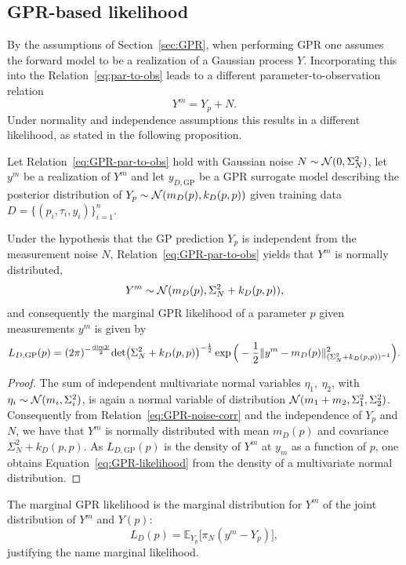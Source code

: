 \subsection{GPR-based likelihood}\label{sec:GPlike}
By the assumptions of Section~\ref{sec:GPR}, when performing GPR one assumes the forward model to be a realization of a Gaussian process $Y$.
Incorporating this into the Relation~\eqref{eq:par-to-obs} leads to a different parameter-to-observation relation
\begin{equation}\label{eq:GPR-par-to-obs}
    Y^m = Y_p + N.
\end{equation}
Under normality and independence assumptions this results in a different likelihood, as stated in the following proposition.

\begin{prp}
    Let Relation~\eqref{eq:GPR-par-to-obs} hold with Gaussian noise $N \sim \mathcal N (0, \Sigma_N^2)$, let $y^m$ be a realization of $Y^m$ and let $y_{D, \text{GP}}$ be a GPR surrogate model describing the posterior distribution of $Y_p \sim \mathcal N( m_D(p), k_D(p,p) )$ given training data $D = \{ (p_i, \tau_i, y_i) \}_{i=1}^n$.

    Under the hypothesis that the GP prediction $Y_p$ is independent from the measurement noise $N$, Relation~\eqref{eq:GPR-par-to-obs} yields that $Y^m$ is normally distributed,
    \[
    Y^m \sim \mathcal N(m_D(p), \Sigma_N^2 + k_D(p,p)), 
    \]
    and consequently the marginal GPR likelihood of a parameter $p$ given measurements $y^m$ is given by
    \begin{equation}\label{eq:GPR-likelihood}
        L_{D, \text{GP}}(p) = (2\pi)^{-\frac{\text{dim} \mathcal Y}{2}} \text{det}\big ( \Sigma_N^2 + k_D(p, p) \big )^{-\frac{1}{2}} \exp \Big( -\frac{1}{2}\lVert y^m - m_D(p)\rVert_{(\Sigma_N^2 + k_D(p,p))^{-1}}^2 \Big ).
    \end{equation}
\end{prp}
\begin{proof}
    The sum of independent multivariate normal variables $\eta_1, \ \eta_2$, with $\eta_i \sim \mathcal N(m_i, \Sigma^2_i)$, is again a normal variable of distribution $\mathcal N ( m_1 + m_2, \Sigma_1^2, \Sigma_2^2)$.
    Consequently from Relation~\eqref{eq:GPR-noise-corr} and the independence of $Y_p$ and $N$, we have that $Y^m$ is normally distributed with mean $m_D(p)$ and covariance $\Sigma_N^2 + k_D(p,p)$. \newline
    As $L_{D, \text{GP}}(p)$ is the density of $Y^m$ at $y_m$ as a function of $p$, one obtains Equation~\eqref{eq:GPR-likelihood} from the density of a multivariate normal distribution.
\end{proof}
\begin{rmk}
    The marginal GPR likelihood is the marginal distribution for $Y^m$ of the joint distribution of $Y^m$ and $Y(p)$:
    \begin{equation*}
        L_{D}(p) =  \mathbb E_{Y_p} \Big [ \pi_N (y^m - Y_p) \Big ],
    \end{equation*}
    justifying the name marginal likelihood.
\end{rmk}

